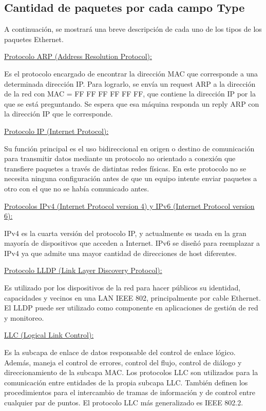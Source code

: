 \subsection{Cantidad de paquetes por cada campo Type}\label{"Type"}

A continuación, se mostrará una breve descripción de cada uno de los tipos de los paquetes Ethernet.

\underline{Protocolo ARP (Address Resolution Protocol):}

Es el protocolo encargado de encontrar la dirección MAC que corresponde a una determinada dirección IP. Para lograrlo, se envía un request ARP a la dirección de la red con MAC = FF FF FF FF FF FF, que contiene la dirección IP por la que se está preguntando. Se espera que esa máquina responda un reply ARP con la dirección IP que le corresponde.

\underline{Protocolo IP (Internet Protocol):}

Su función principal es el uso bidireccional en origen o destino de comunicación para transmitir datos mediante un protocolo no orientado a conexión que transfiere paquetes a través de distintas redes físicas.
En este protocolo no se necesita ninguna configuración antes de que un equipo intente enviar paquetes a otro con el que no se había comunicado antes.

\underline{Protocolos IPv4 (Internet Protocol version 4) y IPv6 (Internet Protocol version 6):}

IPv4 es la cuarta versión del protocolo IP, y actualmente es usada en la gran mayoría de dispositivos que acceden a Internet. IPv6 se diseñó para reemplazar a IPv4 ya que admite una mayor cantidad de direcciones de host diferentes.

\underline{Protocolo LLDP (Link Layer Discovery Protocol):}

Es utilizado por los dispositivos de la red para hacer públicos su identidad, capacidades y vecinos en una LAN IEEE 802, principalmente por cable Ethernet.
El LLDP puede ser utilizado como componente en aplicaciones de gestión de red y monitoreo.
	
\underline{LLC (Logical Link Control):}

Es la subcapa de enlace de datos responsable del control de enlace lógico. Además, maneja el control de errores, control del flujo, control de diálogo y direccionamiento de la subcapa MAC.
Los protocolos LLC son utilizados para la comunicación entre entidades de la propia subcapa LLC. También definen los procedimientos para el intercambio de tramas de información y de control entre cualquier par de puntos. 
El protocolo LLC más generalizado es IEEE 802.2.



